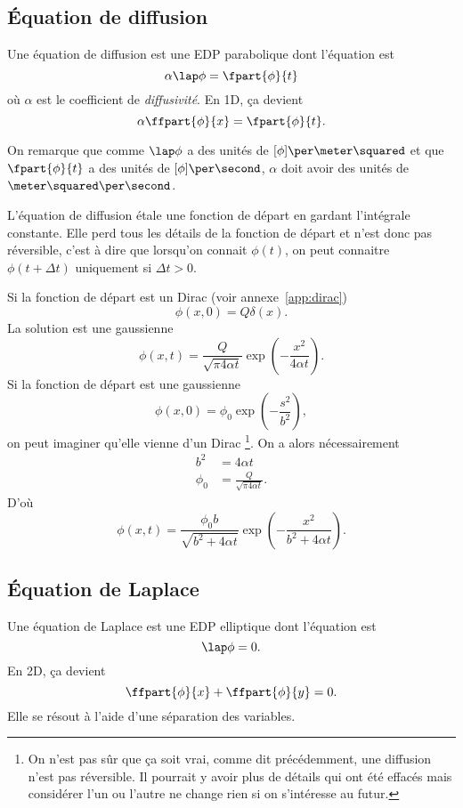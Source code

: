 \subsection{Équation de diffusion}
Une équation de diffusion est une EDP parabolique dont l'équation est
\[ \alpha \lap \phi = \fpart{\phi}{t} \]
où $\alpha$ est le coefficient de \emph{diffusivité}.
En 1D, ça devient
\[ \alpha \ffpart{\phi}{x} = \fpart{\phi}{t}. \]

\begin{myrem}
  On remarque que comme $\lap \phi$ a des unités de $[\phi]\per\meter\squared$
  et que $\fpart{\phi}{t}$ a des unités de $[\phi]\per\second$,
  $\alpha$ doit avoir des unités de $\meter\squared\per\second$.
\end{myrem}

L'équation de diffusion étale une fonction de départ en gardant
l'intégrale constante.
Elle perd tous les détails de la fonction de départ et n'est donc
pas réversible, c'est à dire que lorsqu'on connait $\phi(t)$, on
peut connaitre $\phi(t + \Delta t)$ uniquement si $\Delta t > 0$.

Si la fonction de départ est un Dirac (voir annexe~\ref{app:dirac})
\[ \phi(x, 0) = Q \delta(x). \]
La solution est une gaussienne
\[ \phi(x, t) = \frac{Q}{\sqrt{\pi4\alpha t}}
\exp\left(-\frac{x^2}{4\alpha t}\right). \]
Si la fonction de départ est une gaussienne
\[ \phi(x, 0) = \phi_0 \exp\left(-\frac{s^2}{b^2}\right), \]
on peut imaginer qu'elle vienne d'un Dirac
\footnote{On n'est pas sûr que ça soit vrai,
comme dit précédemment, une diffusion n'est pas réversible.
Il pourrait y avoir plus de détails qui
ont été effacés mais considérer l'un ou l'autre ne change rien
si on s'intéresse au futur.}.
On a alors nécessairement
\begin{align*}
  b^2 & = 4\alpha t\\
  \phi_0 & = \frac{Q}{\sqrt{\pi4\alpha t}}.
\end{align*}
D'où
\[ \phi(x, t) = \frac{\phi_0b}{\sqrt{b^2 + 4\alpha t}}
\exp\left(-\frac{x^2}{b^2 + 4\alpha t}\right). \]

\subsection{Équation de Laplace}
Une équation de Laplace est une EDP elliptique dont l'équation est
\[ \lap \phi = 0. \]
En 2D, ça devient
\[ \ffpart{\phi}{x} + \ffpart{\phi}{y} = 0. \]
Elle se résout à l'aide d'une séparation des variables.

